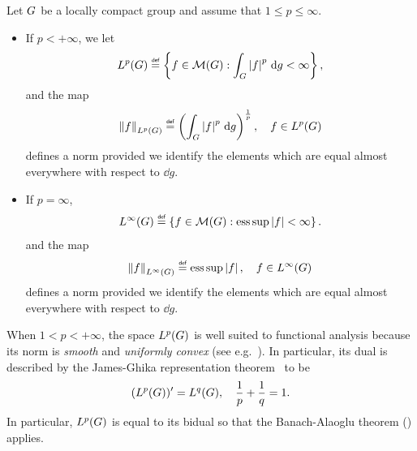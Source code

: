 \begin{definition}
    Let $G$ be a locally compact group
    and assume that $1 \leq p \leq \infty$.
    \begin{itemize}
        \item
            If $p < +\infty$,
            we let
            \begin{align*}
                \Lebesgue p \Group
                \defeq
                \left\{f \in \mathcal M(\Group) : \int_\Group \abs f^p \dd g < \infty\right\},
            \end{align*}
            and the map
            \begin{align*}
                \norm [\Lebesgue p \Group] f
                \defeq \left(\int_\Group \abs f^p \dd g\right)^{\frac 1 p},
                \quad f \in \Lebesgue p \Group
            \end{align*}
            defines a norm provided we identify the elements
            which are equal almost everywhere with respect to $\dd g$.
        \item
            If $p = \infty$,
            \begin{align*}
                \Lebesgue {\infty} \Group
                \defeq
                \left\{f \in \mathcal M(\Group) : \esssup \abs f < \infty\right\}.
            \end{align*}
            and the map
            \begin{align*}
                \norm [\Lebesgue \infty \Group] f
                \defeq \esssup \abs f,
                \quad f \in \Lebesgue \infty \Group
            \end{align*}
            defines a norm provided we identify the elements
            which are equal almost everywhere with respect to $\dd g$.
    \end{itemize}
\end{definition}

When $1 < p < +\infty$,
the space ${L^{p} (G)}$ is well suited to functional analysis
because its norm is \emph{smooth} and \emph{uniformly convex} (see e.g.~\cite[Proposition 5.4.1 and Proposition 5.4.2]{Willem2013}).
In particular,
its dual is described by the James-Ghika representation theorem~\cite[Theorem 5.2.6]{Willem2013} to be
\begin{align*}
    ({L^{p} (G)})' = {L^{q} (G)},
    \quad \frac 1 p + \frac 1 q = 1.
\end{align*}
In particular, ${L^{p} (G)}$ is equal to its bidual
so that the Banach-Alaoglu theorem (\cite[Theorem 3.15]{Rudin91}) applies.


